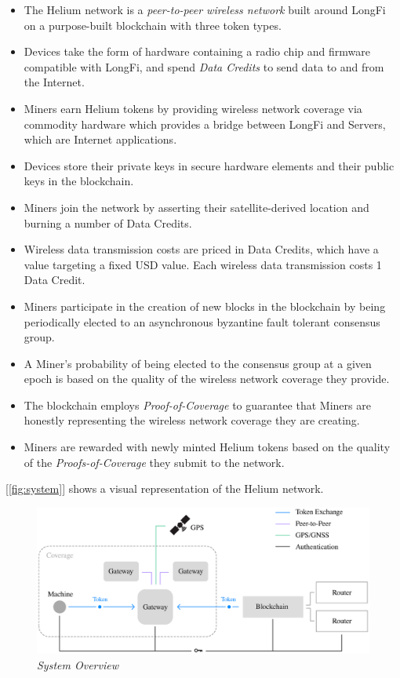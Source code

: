 \documentclass[10pt, nonatbib, nocopyrightspace, reprint]{sigplanconf}
\newcommand{\figref}[1]{[\autoref{#1}]}
\begin{document}
\begin{itemize}
    \item The Helium network is a \emph{peer-to-peer wireless network} built around LongFi on a purpose-built blockchain with three token types.
    \item Devices take the form of hardware containing a radio chip and firmware compatible with LongFi, and spend \emph{Data Credits} to send data to and from the Internet.
    \item Miners earn Helium tokens by providing wireless network coverage via commodity hardware which provides a bridge between LongFi and Servers, which are Internet applications.
    \item Devices store their private keys in secure hardware elements and their public keys in the blockchain.
    \item Miners join the network by asserting their satellite-derived location and burning a number of Data Credits.
    \item Wireless data transmission costs are priced in Data Credits, which have a value targeting a fixed USD value. Each wireless data transmission costs 1 Data Credit.
    \item Miners participate in the creation of new blocks in the blockchain by being periodically elected to an asynchronous byzantine fault tolerant consensus group.
    \item A Miner's probability of being elected to the consensus group at a given epoch is based on the quality of the wireless network coverage they provide.
    \item The blockchain employs \emph{Proof-of-Coverage} to guarantee that Miners are honestly representing the wireless network coverage they are creating.
    \item Miners are rewarded with newly minted Helium tokens based on the quality of the \emph{Proofs-of-Coverage} they submit to the network.
\end{itemize}

\figref{fig:system} shows a visual representation of the Helium network.

\begin{figure}[ht]
    \begin{center}
          \includegraphics[width=\textwidth]{schematic.eps}
          \caption{\emph{System Overview}}\label{fig:system}
     \end{center}
\end{figure}
\end{document}
